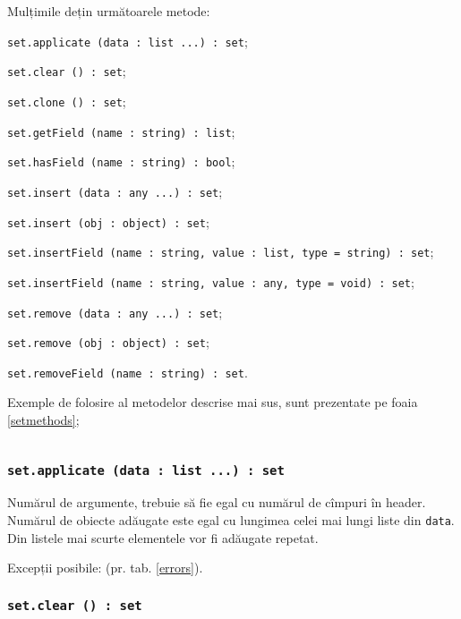 Mulțimile dețin următoarele metode:
\begin{icItems}
\item \texttt{set.applicate (data : list ...) : set};
\item \texttt{set.clear () : set};
\item \texttt{set.clone () : set};
\item \texttt{set.getField (name : string) : list};
\item \texttt{set.hasField (name : string) : bool};
\item \texttt{set.insert (data : any ...) : set};
\item \texttt{set.insert (obj : object) : set};
\item \texttt{set.insertField (name : string, value : list, type = string) : set};
\item \texttt{set.insertField (name : string, value : any, type = void) : set};
\item \texttt{set.remove (data : any ...) : set};
\item \texttt{set.remove (obj : object) : set};
\item \texttt{set.removeField (name : string) : set}.
\end{icItems}

Exemple de folosire al metodelor descrise mai sus, sunt prezentate pe foaia \ref{setmethods};

\begin{sourcecode}
    \label{setmethods}
    \inputminted[linenos]{icl}{../sources/setmethods.icL}
\end{sourcecode}

\subsubsection{\texttt{set.applicate (data : list ...) : set}}

Numărul de argumente, trebuie să fie egal cu numărul de cîmpuri în header. Numărul de obiecte adăugate este egal cu lungimea celei mai lungi liste din \texttt{data}. Din listele mai scurte elementele vor fi adăugate repetat.

Excepții posibile:  (pr. tab. \ref{errors}).

\subsubsection{\texttt{set.clear () : set}}

